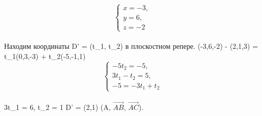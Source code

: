 \documentclass{article}
\begin{document}
\Rightarrow 
\begin{equation*}
 \begin{cases}
   x = -3, 
   \\
   y = 6,
   \\
   z = -2
 \end{cases}
\end{equation*}\\
Находим координаты D' = (t_1, t_2) в плоскостном репере.
(-3,6,-2) - (2,1,3) = t_1(0,3,-3) + t_2(-5,-1,1) \Rightarrow 
\begin{equation*}
 \begin{cases}
   -5t_2 = -5, 
   \\
   3t_1 - t_2 = 5,
   \\
   -5 = -3t_1 + t_2
 \end{cases}
\end{equation*}\\
\Rightarrow 3t_1 = 6, t_2 = 1
\Rightarrow D' = (2,1) \in (A, $\overrightarrow{AB}$, $\overrightarrow{AC}$).
\end{document}
